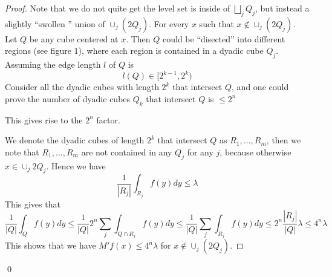 \begin{proof}
    Note that we do not quite get the level set is inside of $\bigsqcup_jQ_j$, but  instead a slightly ``swollen '' union of $\cup_j(2Q_j)$. For every $x$ such that $x\not\in \cup_j(2Q_j)$. Let $Q$ be any  cube centered at $x$. Then $Q$ could be ``disected'' into different regions (see figure 1), where each region is contained in a dyadic cube $Q_j$. Assuming the edge length $l$ of $Q$ is
    \begin{equation*}
        l(Q)\in [2^{k-1}, 2^k)
    \end{equation*}
    Consider all the dyadic cubes with length $2^k$ that intersect $Q$, and one could prove the number of dyadic cubes $Q_k$ that intersect $Q$ is $\leq 2^n$
    \begin{note}
        This gives rise to the $2^n$ factor.
    \end{note}
    We denote the dyadic cubes of length $2^k$ that intersect $Q$ as $R_1, ..., R_m$, then we note that $R_1, ..., R_m$ are not contained in any $Q_j$ for any $j$, because otherwise $x\in\cup_j 2Q_j$. Hence we have
    \begin{equation}
        \frac{1}{|R_j|}\int_{R_j}f(y)dy\leq \lambda
    \end{equation}
    This gives that
    \begin{equation}
        \frac{1}{|Q|}\int_Qf(y)dy\leq \frac{1}{|Q|}2^n\sum_j\int_{Q\cap R_j}f(y)dy\leq\frac{1}{|Q|}\sum_j\int_{R_j}f(y)dy\leq 2^n \frac{|R_j|}{|Q|}\lambda\leq 4^n\lambda
    \end{equation}
    This shows that we have $M'f(x)\leq 4^n\lambda$ for $x\not\in\cup_j(2Q_j)$.
\end{proof}
\qed


